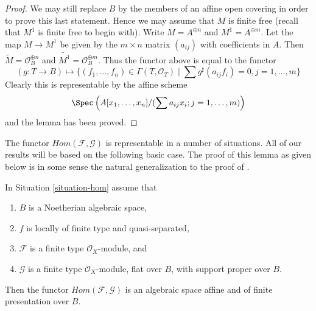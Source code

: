 \begin{proof}
\medskip\noindent
We may still replace $B$ by the members of an affine open covering
in order to prove this last statement. Hence we may assume that $M$
is finite free (recall that $M^1$ is finite free to begin with).
Write $M = A^{\oplus n}$ and $M^1 = A^{\oplus m}$. Let the map
$M \to M^1$ be given by the $m \times n$ matrix $(a_{ij})$ with
coefficients in $A$. Then $\widetilde{M} = \mathcal{O}_B^{\oplus n}$
and $\widetilde{M^1} = \mathcal{O}_B^{\oplus m}$. Thus the functor
above is equal to the functor
$$
(g : T \to B) \longmapsto
\{(f_1, \ldots, f_n) \in \Gamma(T, \mathcal{O}_T) \mid
\sum g^\sharp(a_{ij}f_i) = 0, j = 1, \ldots, m\}
$$
Clearly this is representable by the affine scheme
$$
\Spec\left(A[x_1, \ldots, x_n]/(\sum a_{ij}x_i; j = 1, \ldots, m)\right)
$$
and the lemma has been proved.
\end{proof}

\noindent
The functor $\mathit{Hom}(\mathcal{F}, \mathcal{G})$ is representable in a
number of situations. All of our results will be based on the following
basic case. The proof of this lemma as given below is in some sense the
natural generalization to the proof of \cite[III, Cor 7.7.8]{EGA}.

\begin{lemma}
\label{lemma-noetherian-hom}
In Situation \ref{situation-hom} assume that
\begin{enumerate}
\item $B$ is a Noetherian algebraic space,
\item $f$ is locally of finite type and quasi-separated,
\item $\mathcal{F}$ is a finite type $\mathcal{O}_X$-module, and
\item $\mathcal{G}$ is a finite type $\mathcal{O}_X$-module, flat over $B$,
with support proper over $B$.
\end{enumerate}
Then the functor $\mathit{Hom}(\mathcal{F}, \mathcal{G})$ is
an algebraic space affine and of finite presentation over $B$.
\end{lemma}

